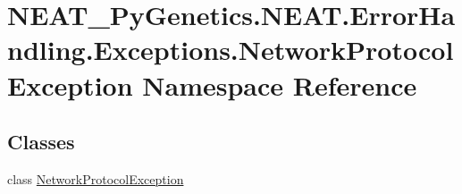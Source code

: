 \hypertarget{namespaceNEAT__PyGenetics_1_1NEAT_1_1ErrorHandling_1_1Exceptions_1_1NetworkProtocolException}{}\section{N\+E\+A\+T\+\_\+\+Py\+Genetics.\+N\+E\+A\+T.\+Error\+Handling.\+Exceptions.\+Network\+Protocol\+Exception Namespace Reference}
\label{namespaceNEAT__PyGenetics_1_1NEAT_1_1ErrorHandling_1_1Exceptions_1_1NetworkProtocolException}
\subsection*{Classes}
\begin{DoxyCompactItemize}
\item 
class \hyperlink{classNEAT__PyGenetics_1_1NEAT_1_1ErrorHandling_1_1Exceptions_1_1NetworkProtocolException_1_1NetworkProtocolException}{Network\+Protocol\+Exception}
\end{DoxyCompactItemize}
